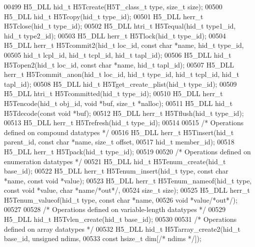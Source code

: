 \begin{DoxyCode}
00499 H5\_DLL hid\_t H5Tcreate(H5T\_class\_t type, \textcolor{keywordtype}{size\_t} size);
00500 H5\_DLL hid\_t H5Tcopy(hid\_t type\_id);
00501 H5\_DLL herr\_t H5Tclose(hid\_t type\_id);
00502 H5\_DLL htri\_t H5Tequal(hid\_t type1\_id, hid\_t type2\_id);
00503 H5\_DLL herr\_t H5Tlock(hid\_t type\_id);
00504 H5\_DLL herr\_t H5Tcommit2(hid\_t loc\_id, \textcolor{keyword}{const} \textcolor{keywordtype}{char} *name, hid\_t type\_id,
00505     hid\_t lcpl\_id, hid\_t tcpl\_id, hid\_t tapl\_id);
00506 H5\_DLL hid\_t H5Topen2(hid\_t loc\_id, \textcolor{keyword}{const} \textcolor{keywordtype}{char} *name, hid\_t tapl\_id);
00507 H5\_DLL herr\_t H5Tcommit\_anon(hid\_t loc\_id, hid\_t type\_id, hid\_t tcpl\_id, hid\_t tapl\_id);
00508 H5\_DLL hid\_t H5Tget\_create\_plist(hid\_t type\_id);
00509 H5\_DLL htri\_t H5Tcommitted(hid\_t type\_id);
00510 H5\_DLL herr\_t H5Tencode(hid\_t obj\_id, \textcolor{keywordtype}{void} *buf, \textcolor{keywordtype}{size\_t} *nalloc);
00511 H5\_DLL hid\_t H5Tdecode(\textcolor{keyword}{const} \textcolor{keywordtype}{void} *buf);
00512 H5\_DLL herr\_t H5Tflush(hid\_t type\_id);
00513 H5\_DLL herr\_t H5Trefresh(hid\_t type\_id);
00514 
00515 \textcolor{comment}{/* Operations defined on compound datatypes */}
00516 H5\_DLL herr\_t H5Tinsert(hid\_t parent\_id, \textcolor{keyword}{const} \textcolor{keywordtype}{char} *name, \textcolor{keywordtype}{size\_t} offset,
00517              hid\_t member\_id);
00518 H5\_DLL herr\_t H5Tpack(hid\_t type\_id);
00519 
00520 \textcolor{comment}{/* Operations defined on enumeration datatypes */}
00521 H5\_DLL hid\_t H5Tenum\_create(hid\_t base\_id);
00522 H5\_DLL herr\_t H5Tenum\_insert(hid\_t type, \textcolor{keyword}{const} \textcolor{keywordtype}{char} *name, \textcolor{keyword}{const} \textcolor{keywordtype}{void} *value);
00523 H5\_DLL herr\_t H5Tenum\_nameof(hid\_t type, \textcolor{keyword}{const} \textcolor{keywordtype}{void} *value, \textcolor{keywordtype}{char} *name\textcolor{comment}{/*out*/},
00524                  \textcolor{keywordtype}{size\_t} size);
00525 H5\_DLL herr\_t H5Tenum\_valueof(hid\_t type, \textcolor{keyword}{const} \textcolor{keywordtype}{char} *name,
00526                   \textcolor{keywordtype}{void} *value\textcolor{comment}{/*out*/});
00527 
00528 \textcolor{comment}{/* Operations defined on variable-length datatypes */}
00529 H5\_DLL hid\_t H5Tvlen\_create(hid\_t base\_id);
00530 
00531 \textcolor{comment}{/* Operations defined on array datatypes */}
00532 H5\_DLL hid\_t H5Tarray\_create2(hid\_t base\_id, \textcolor{keywordtype}{unsigned} ndims,
00533             \textcolor{keyword}{const} hsize\_t dim[\textcolor{comment}{/* ndims */}]);

\end{DoxyCode}
